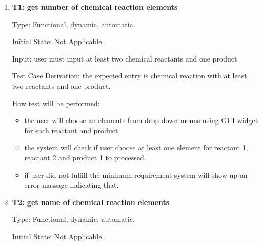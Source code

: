 \documentclass[12pt, titlepage]{article}
\begin{document}
\begin{enumerate}

\item{\bf T1: get number of chemical reaction elements \\}

Type: Functional, dynamic, automatic.
					
Initial State: Not Applicable. 
					
Input: user must input at least two chemical reactants and one product 
\begin{table}[h!]
\centering
{}
\caption{Input possible entries and its corresponding outputs }
\label{tab:reqtrace}
\end{table}

Test Case Derivation: the expected entry is chemical reaction with at least two reactants and one product. 

How test will be performed: 
\begin{itemize}
\item the user will choose an elements from drop down menus using GUI widget for each reactant and product
\item the system will check if user choose at least one element for reactant 1, reactant 2 and product 1 to processed. 
\item if user did not fulfill the minimum requirement system will show up an error massage indicating that. 
\end{itemize}

\item{\bf T2: get name of chemical reaction elements \\}

Type: Functional, dynamic, automatic.
					
Initial State: Not Applicable. 
					

\end{enumerate}
\end{document}
